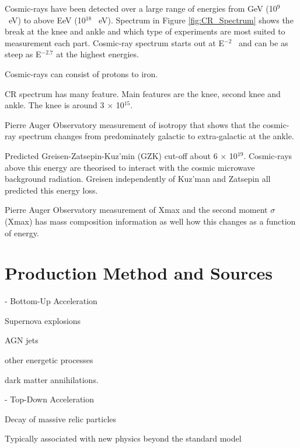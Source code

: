 Cosmic-rays have been detected over a large range of energies from GeV (10$^9$ \ eV) to above EeV (10$^18$ \ eV). Spectrum in Figure \ref{fig:CR_Spectrum} shows the break at the knee and ankle and which type of experiments are most suited to measurement each part. Cosmic-ray spectrum starts out at E$^{-2}$ \ and can be as steep as E$^{-2.7}$ at the highest energies.

Cosmic-rays can consist of protons to iron. 

CR spectrum has many feature. Main features are the knee, second knee and ankle. The knee is around 3 $\times$ 10$^{15}$.

Pierre Auger Observatory measurement of isotropy that shows that the cosmic-ray spectrum changes from predominately galactic to extra-galactic at the ankle.

Predicted Greisen-Zatsepin-Kuz’min (GZK) cut-off about 6 $\times$ 10$^{19}$. Cosmic-rays above this energy are theorised to interact with the cosmic microwave background radiation. Greisen independently of Kuz'man and Zatsepin all predicted this energy loss.

Pierre Auger Observatory measurement of Xmax and the second moment $\sigma$(Xmax) has mass composition information as well how this changes as a function of energy.

\section{Production Method and Sources}

- Bottom-Up Acceleration 

Supernova explosions 

AGN jets

other energetic processes

dark matter annihilations.

- Top-Down Acceleration

Decay of massive relic particles

Typically associated with new physics beyond the standard model